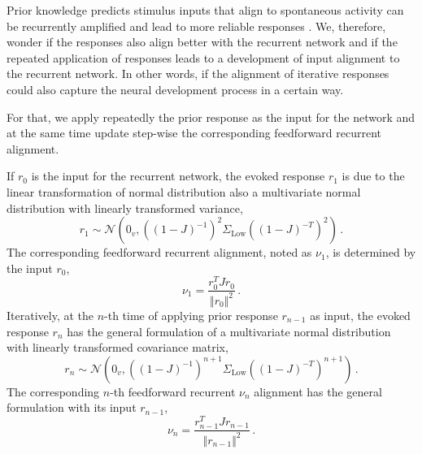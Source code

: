 \documentclass[11pt]{article}
\begin{document}
	Prior knowledge predicts stimulus inputs that align to spontaneous activity can be recurrently amplified and lead to more reliable responses \cite{mulholland2023selective}. 
	We, therefore, wonder if the responses also align better with the recurrent network and if the repeated application of responses leads to a development of input alignment to the recurrent network. In other words, if the alignment of iterative responses could also capture the neural development process in a certain way.
	
	For that, we apply repeatedly the prior response as the input for the network and at the same time update step-wise the corresponding feedforward recurrent alignment. 
	
	If $r_0$ is the input for the recurrent network, the evoked response $r_1$ is due to the linear transformation of normal distribution also a multivariate normal distribution with linearly transformed variance, 
		\begin{equation}
			r_1 \sim \mathcal{N}\left(0_v, \left((1-J)^{-1}\right)^2 \Sigma_{\text{Low}} \left((1-J)^{-T}\right)^2\right) \, .
		\end{equation}
	The corresponding feedforward recurrent alignment, noted as $\nu_1$, is determined by the input $r_0$,
		\begin{equation}
			\nu_1 = \frac{r_0^T J r_0}{\Vert r_0 \Vert^2}\, .
		\end{equation}
	Iteratively, at the $n$-th time of applying prior response $r_{n-1}$ as input, the evoked response $r_n$ has the general formulation of a multivariate normal distribution with linearly transformed covariance matrix,
		\begin{equation}
			r_n \sim \mathcal{N}\left( 0_v, \left((1-J)^{-1}\right)^{n+1} \Sigma_{\text{Low}} \left((1-J)^{-T}\right)^{n+1} \right) \,. 
		\end{equation}
	The corresponding $n$-th feedforward recurrent $\nu_n$ alignment has the general formulation with its input $r_{n-1}$,
		\begin{equation} \label{eq:update_ffrec}
			\nu_n = \frac{r_{n-1}^T J r_{n-1}}{\Vert r_{n-1} \Vert^2} \,.
		\end{equation}
	
	
	\clearpage
\end{document}
